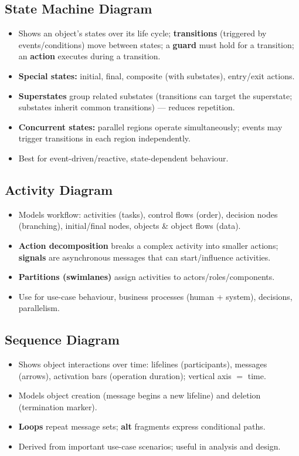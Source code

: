 \documentclass[hidelinks]{article}
\begin{document}
\subsection{State Machine Diagram}
\begin{itemize}
  \item Shows an object's states over its life cycle; \textbf{transitions} (triggered by
        events/conditions) move between states; a \textbf{guard} must hold for a transition; an
        \textbf{action} executes during a transition.
  \item \textbf{Special states:} initial, final, composite (with substates), entry/exit actions.
  \item \textbf{Superstates} group related substates (transitions can target the superstate;
        substates inherit common transitions) --- reduces repetition.
  \item \textbf{Concurrent states:} parallel regions operate simultaneously; events may trigger
        transitions in each region independently.
  \item Best for event-driven/reactive, state-dependent behaviour.
\end{itemize}

\subsection{Activity Diagram}
\begin{itemize}
  \item Models workflow: activities (tasks), control flows (order), decision nodes (branching),
        initial/final nodes, objects \& object flows (data).
  \item \textbf{Action decomposition} breaks a complex activity into smaller actions;
        \textbf{signals} are asynchronous messages that can start/influence activities.
  \item \textbf{Partitions (swimlanes)} assign activities to actors/roles/components.
  \item Use for use-case behaviour, business processes (human + system), decisions, parallelism.
\end{itemize}

\subsection{Sequence Diagram}
\begin{itemize}
  \item Shows object interactions over time: lifelines (participants), messages (arrows),
        activation bars (operation duration); vertical axis $=$ time.
  \item Models object creation (message begins a new lifeline) and deletion (termination marker).
  \item \textbf{Loops} repeat message sets; \textbf{alt} fragments express conditional paths.
  \item Derived from important use-case scenarios; useful in analysis and design.
\end{itemize}
\end{document}
